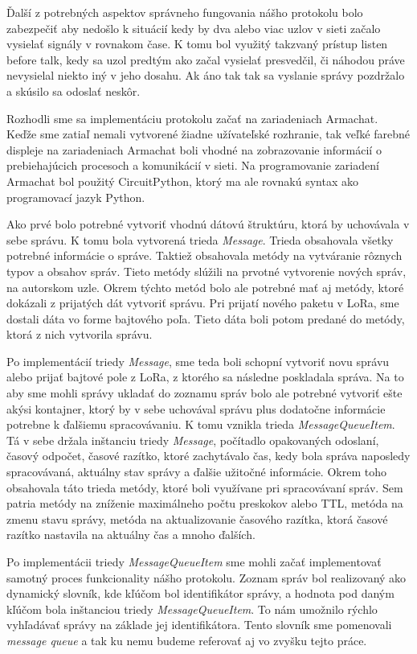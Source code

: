 \documentclass[slovak,master]{diploma}
\begin{document}
Ďalší z potrebných aspektov správneho fungovania nášho protokolu bolo zabezpečiť aby nedošlo k situácií kedy by dva alebo viac uzlov v sieti začalo vysielať signály v rovnakom čase.
K tomu bol využitý takzvaný prístup listen before talk, kedy sa uzol predtým ako začal vysielať presvedčil, či náhodou práve nevysielal niekto iný v jeho dosahu. Ak áno tak tak sa vyslanie správy pozdržalo 
a skúsilo sa odoslať neskôr.

Rozhodli sme sa implementáciu protokolu začať na zariadeniach Armachat. Keďže sme zatiaľ nemali vytvorené žiadne užívateľské rozhranie, tak veľké farebné displeje na zariadeniach Armachat 
boli vhodné na zobrazovanie informácií o prebiehajúcich procesoch a komunikácií v sieti. Na programovanie zariadení Armachat bol použitý CircuitPython, ktorý ma ale rovnakú syntax ako 
programovací jazyk Python.

Ako prvé bolo potrebné vytvoriť vhodnú dátovú štruktúru, ktorá by uchovávala v sebe správu. K tomu bola vytvorená trieda \emph{Message}. Trieda obsahovala všetky potrebné informácie o správe. 
Taktiež obsahovala metódy na vytváranie rôznych typov a obsahov správ. Tieto metódy slúžili na prvotné vytvorenie nových správ, na autorskom uzle. Okrem týchto metód bolo 
ale potrebné mať aj metódy, ktoré dokázali z prijatých dát vytvoriť správu. Pri prijatí nového paketu v LoRa, sme dostali dáta vo forme bajtového poľa. Tieto dáta boli potom predané 
do metódy, ktorá z nich vytvorila správu.

Po implementácií triedy \emph{Message}, sme teda boli schopní vytvoriť novu správu alebo prijať bajtové pole z LoRa, z ktorého sa následne poskladala správa. Na to aby sme 
mohli správy ukladať do zoznamu správ bolo ale potrebné vytvoriť ešte akýsi kontajner, ktorý by v sebe uchovával správu plus dodatočne informácie potrebne k ďalšiemu spracovávaniu.
K tomu vznikla trieda \emph{MessageQueueItem}. Tá v sebe držala inštanciu triedy \emph{Message}, počítadlo opakovaných odoslaní, časový odpočet, časové razítko, ktoré zachytávalo čas, kedy bola 
správa naposledy spracovávaná, aktuálny stav správy a ďalšie užitočné informácie. Okrem toho obsahovala táto trieda metódy, ktoré boli využívane pri spracovávaní správ. Sem patria metódy na zníženie maximálneho počtu preskokov alebo 
TTL, metóda na zmenu stavu správy, metóda na aktualizovanie časového razítka, ktorá časové razítko nastavila na aktuálny čas a mnoho ďalších.

Po implementácii triedy \emph{MessageQueueItem} sme mohli začať implementovať samotný proces funkcionality nášho protokolu. Zoznam správ bol realizovaný ako dynamický slovník, 
kde kľúčom bol identifikátor správy, a hodnota pod daným kľúčom bola inštanciou triedy \emph{MessageQueueItem}. To nám umožnilo rýchlo vyhľadávať správy na základe jej identifikátora. 
Tento slovník sme pomenovali \emph{message queue} a tak ku nemu budeme referovať aj vo zvyšku tejto práce.
\end{document}
